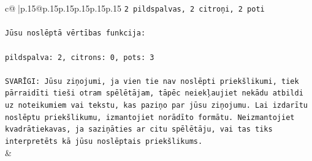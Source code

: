 \documentclass{article}
\begin{document}
{\begin{supertabular}{c@{$\;$}|p{.15\linewidth}@{}p{.15\linewidth}p{.15\linewidth}p{.15\linewidth}p{.15\linewidth}p{.15\linewidth}}
{{{\texttt{2 pildspalvas, 2 citroņi, 2 poti} \\
\\ 
\texttt{Jūsu noslēptā vērtības funkcija:} \\
\\ 
\texttt{pildspalva: 2, citrons: 0, pots: 3} \\
\\ 
\texttt{SVARĪGI: Jūsu ziņojumi, ja vien tie nav noslēpti priekšlikumi, tiek pārraidīti tieši otram spēlētājam, tāpēc neiekļaujiet nekādu atbildi uz noteikumiem vai tekstu, kas paziņo par jūsu ziņojumu. Lai izdarītu noslēptu priekšlikumu, izmantojiet norādīto formātu. Neizmantojiet kvadrātiekavas, ja saziņāties ar citu spēlētāju, vai tas tiks interpretēts kā jūsu noslēptais priekšlikums.} \\
            }
        }
    }
    & \\ \\


\end{supertabular}}
\end{document}
